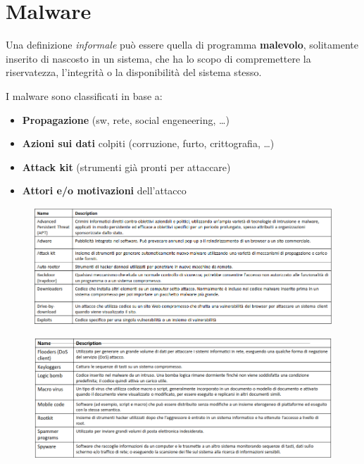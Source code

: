 \chapter{Malware}

Una definizione \textit{informale} può essere quella di programma \textbf{malevolo}, solitamente 
inserito di nascosto in un sistema, che ha lo scopo di compremettere la riservatezza, l'integrità o 
la disponibilità del sistema stesso.


\noindent I malware sono classificati in base a:
\begin{itemize}
    \item \textbf{Propagazione} (sw, rete, social engeneering, \dots)
    \item \textbf{Azioni sui dati} colpiti (corruzione, furto, crittografia, \dots)
    \item \textbf{Attack kit} (strumenti già pronti per attaccare)
    \item \textbf{Attori e/o motivazioni} dell'attacco
\end{itemize}

\begin{figure}[H]
    \centering
    \includegraphics[width=1\linewidth]{chapters/5/images/classification1.png}
\end{figure}

\begin{figure}[H]
    \centering
    \includegraphics[width=1\linewidth]{chapters/5/images/classification2.png}
\end{figure}

